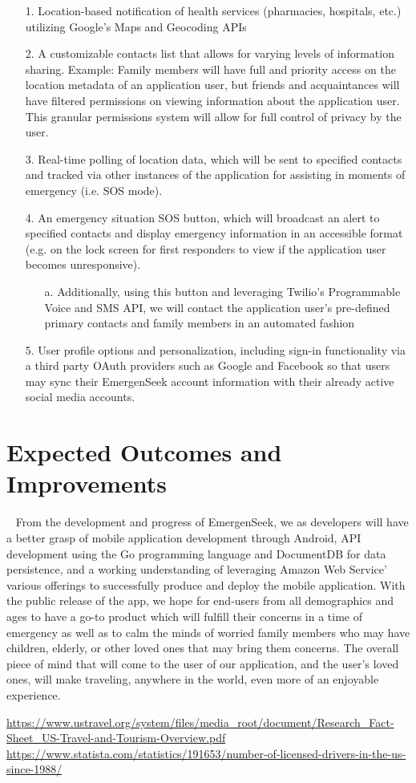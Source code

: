 \documentclass[10pt]{article}
\begin{document}
\begin{enumerate}
\item[1.] Location-based notification of health services (pharmacies, hospitals, etc.) utilizing Google’s Maps and Geocoding APIs
\item[2.] A customizable contacts list that allows for varying levels of information sharing. Example: Family members will have full and priority access on the location metadata of an application user, but friends and acquaintances will have filtered permissions on viewing information about the application user. This granular permissions system will allow for full control of privacy by the user.
\item[3.] Real-time polling of location data, which will be sent to specified contacts and tracked via other instances of the application for assisting in moments of emergency (i.e. SOS mode).
\item[4.] An emergency situation SOS button, which will broadcast an alert to specified contacts and display emergency information in an accessible format (e.g. on the lock screen for first responders to view if the application user becomes unresponsive).
	\begin{itemize}
		\item[a.] Additionally, using this button and leveraging Twilio’s Programmable Voice and SMS API, we will contact the application user’s pre-defined primary contacts and family members in an automated fashion
	\end{itemize}
\item[5.] User profile options and personalization, including sign-in functionality via a third party OAuth providers such as Google and Facebook so that users may sync their EmergenSeek account information with their already active social media accounts.
\end{enumerate}

\section{Expected Outcomes and Improvements}
\par ~ From the development and progress of EmergenSeek, we as developers will have a better grasp of mobile application development through Android, API development using the Go programming language and DocumentDB for data persistence, and a working understanding of leveraging Amazon Web Service' various offerings to successfully produce and deploy the mobile application. With the public release of the app, we hope for end-users from all demographics and ages to have a go-to product which will fulfill their concerns in a time of emergency as well as to calm the minds of worried family members who may have children, elderly, or other loved ones that may bring them concerns. The overall piece of mind that will come to the user of our application, and the user's loved ones, will make traveling, anywhere in the world, even more of an enjoyable experience.

\begin{thebibliography}{9}
\url{https://www.ustravel.org/system/files/media_root/document/Research_Fact-Sheet_US-Travel-and-Tourism-Overview.pdf}
\url{https://www.statista.com/statistics/191653/number-of-licensed-drivers-in-the-us-since-1988/}
\end{thebibliography}
\end{document}

